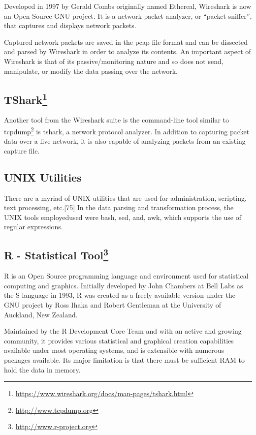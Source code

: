 \documentclass[11pt,a4paper]{article}
\let\rmarkdownfootnote\footnote%
\def\footnote{\protect\rmarkdownfootnote}
\begin{document}
Developed in 1997 by Gerald Combs originally named Ethereal, Wireshark
is now an Open Source GNU project. It is a network packet analyzer, or
``packet sniffer'', that captures and displays network packets.

Captured network packets are saved in the pcap file format and can be
dissected and parsed by Wireshark in order to analyze its contents. An
important aspect of Wireshark is that of its passive/monitoring nature
and so does not send, manipulate, or modify the data passing over the
network.

\subsection*{TShark\footnote{\url{https://www.wireshark.org/docs/man-pages/tshark.html}}}\label{tshark6}

Another tool from the Wireshark suite is the command-line tool similar
to tcpdump\footnote{\url{http://www.tcpdump.org}} is tshark, a network
protocol analyzer. In addition to capturing packet data over a live
network, it is also capable of analyzing packets from an existing
capture file.

\subsection*{UNIX Utilities}\label{unix-utilities}

There are a myriad of UNIX utilities that are used for administration,
scripting, text processing, etc.{[}75{]} In the data parsing and
transformation process, the UNIX tools employedused were bash, sed, and,
awk, which supports the use of regular expressions.

\subsection*{R - Statistical Tool\footnote{\url{http://www.r-project.org}}}\label{r---statistical-tool8}

R is an Open Source programming language and environment used for
statistical computing and graphics. Initially developed by John Chambers
at Bell Labs as the S language in 1993, R was created as a freely
available version under the GNU project by Ross Ihaka and Robert
Gentleman at the University of Auckland, New Zealand.

Maintained by the R Development Core Team and with an active and growing
community, it provides various statistical and graphical creation
capabilities available under most operating systems, and is extensible
with numerous packages available. Its major limitation is that there
must be sufficient RAM to hold the data in memory.
\end{document}
